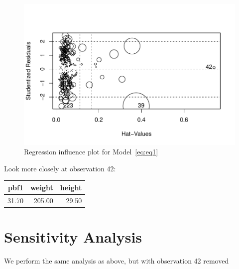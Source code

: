 \documentclass[11pt,letter]{article}\usepackage[]{graphicx}\usepackage[]{color}
\makeatletter
\def\maxwidth{ %
  \ifdim\Gin@nat@width>\linewidth
    \linewidth
  \else
    \Gin@nat@width
  \fi
}
\newenvironment{knitrout}{}{} %
\makeatother
\begin{document}
\begin{knitrout}
\color{fgcolor}\begin{figure}[h]

{\centering \includegraphics[width=\maxwidth]{figure/influence-plot-1} 

}

\caption{Regression influence plot for Model~\eqref{eq:eq1}}\label{fig:influence-plot}
\end{figure}


\end{knitrout}
\FloatBarrier
Look more closely at observation 42:
\begin{table}[ht]
\centering
\begin{tabular}{rrr}
  \hline
pbf1 & weight & height \\ 
  \hline
31.70 & 205.00 & 29.50 \\ 
   \hline
\end{tabular}
\end{table}


\FloatBarrier
\section{Sensitivity Analysis}

We perform the same analysis as above, but with observation 42 removed
\end{document}
